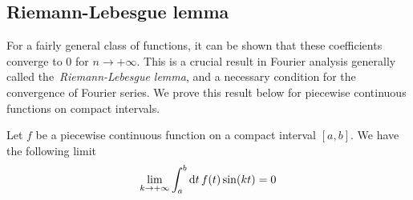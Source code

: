 \subsection{Riemann-Lebesgue lemma}
For a fairly general class of functions, it can be shown that these coefficients converge
to $0$ for $n\to+\infty$. This is a crucial result in Fourier analysis generally called
the~\emph{Riemann-Lebesgue lemma}, and a necessary condition for the convergence of
Fourier series. We prove this result below for piecewise continuous functions on compact
intervals.
\begin{theorem}
	\label{thm:rl}
	Let $f$ be a piecewise continuous function on a compact interval $[a,b]$. We have the
	following limit
	\begin{equation}
		\lim_{k\to+\infty}\int_a^b\mathrm{d} t\, f(t)\sin(kt)=0
	\end{equation}
\end{theorem}
